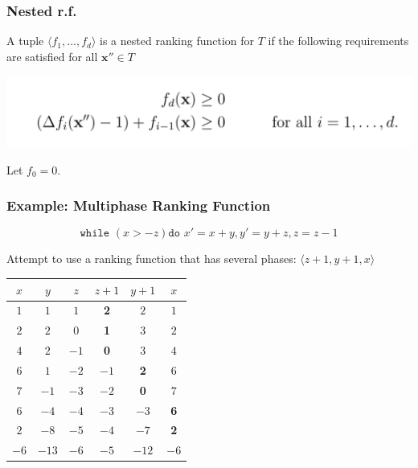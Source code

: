 \documentclass[11pt]{beamer}
\begin{document}
\begin{frame}\frametitle{Nested r.f.}

\begin{definition}

A tuple $\langle f_1, \ldots, f_d\rangle$ is a nested ranking function for $T$ if the following requirements are satisfied for all $\textbf{x}''\in T$
\begin{center}
\includegraphics[scale = 0.3]{6.PNG}

\end{center}

Let $f_0 = 0$.
\end{definition}


\end{frame}
\begin{frame}\frametitle{Example: Multiphase Ranking Function}
\[\texttt{while }( x > -z) \texttt{do } x' = x + y, y' = y + z, z = z - 1\]

Attempt to use a ranking function that has several phases: 
$\langle z + 1, y + 1, x\rangle$
\begin{center}
\begin{tabular}{|c|c|c|c|c|c|}
\hline 
$x$&$y$&$z$&$z+1$&$y+1$&$x$\\
\hline
$1$&$1$&$1$&\textbf{2}&$2$&$1$\\
$2$&$2$&$0$&\textbf{1}&$3$&$2$\\
$4$&$2$&$-1$&\textbf{0}&$3$&$4$\\
\hline
$6$&$1$&$-2$&$-1$&\textbf{2}&$6$\\
$7$&$-1$&$-3$&$-2$&\textbf{0}&$7$\\
\hline
$6$&$-4$&$-4$&$-3$&$-3$&\textbf{6}\\
$2$&$-8$&$-5$&$-4$&$-7$&\textbf{2}\\
\hline
$-6$&$-13$&$-6$&$-5$&$-12$&$-6$\\
\hline
\end{tabular}
\end{center}
\end{frame}
\end{document}
